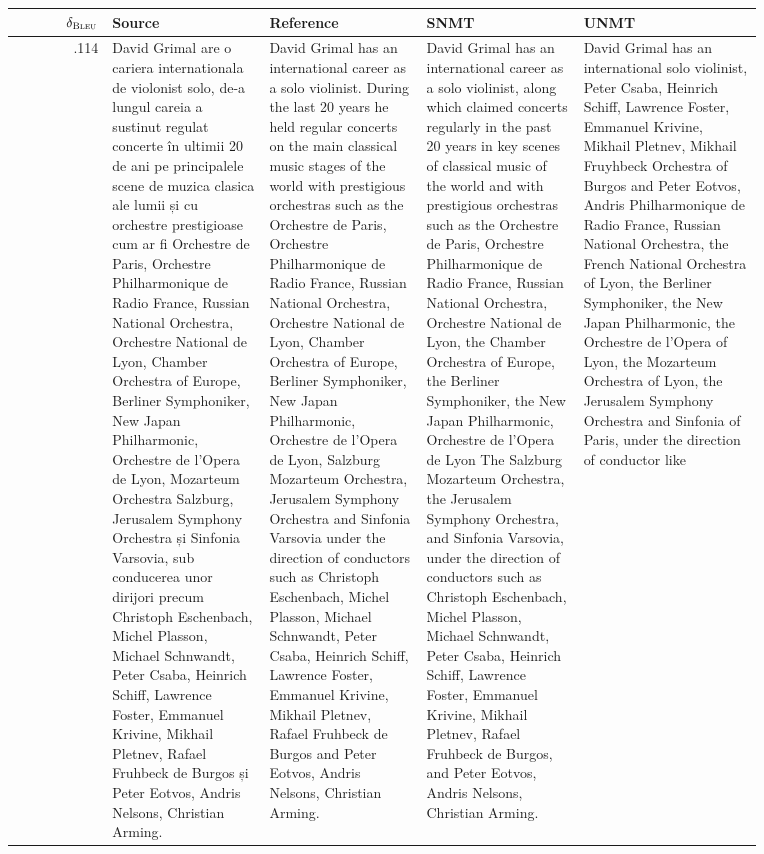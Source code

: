 \begin{table}[ht]
\centering
\fontsize{6.5}{6.5}
\selectfont
\begin{tabular}{r @{\hspace{1mm}} p{0.21\linewidth}p{0.21\linewidth}p{0.21\linewidth}p{0.24\linewidth}}
 $\delta_{{\textsc{Bleu}}}$& Source & Reference & SNMT & UNMT \\\hline\hline
.114 & David Grimal are o cariera internationala de violonist solo, de-a lungul careia a sustinut regulat concerte în ultimii 20 de ani pe principalele scene de muzica clasica ale lumii și cu orchestre prestigioase cum ar fi Orchestre de Paris, Orchestre Philharmonique de Radio France, Russian National Orchestra, Orchestre National de Lyon, Chamber Orchestra of Europe, Berliner Symphoniker, New Japan Philharmonic, Orchestre de l'Opera de Lyon, Mozarteum Orchestra Salzburg, Jerusalem Symphony Orchestra și Sinfonia Varsovia, sub conducerea unor dirijori precum Christoph Eschenbach, Michel Plasson, Michael Schnwandt, Peter Csaba, Heinrich Schiff, Lawrence Foster, Emmanuel Krivine, Mikhail Pletnev, Rafael Fruhbeck de Burgos și Peter Eotvos, Andris Nelsons, Christian Arming. & David Grimal has an international career as a solo violinist. During the last 20 years he held regular concerts on the main classical music stages of the world with prestigious orchestras such as the Orchestre de Paris, Orchestre Philharmonique de Radio France, Russian National Orchestra, Orchestre National de Lyon, Chamber Orchestra of Europe, Berliner Symphoniker, New Japan Philharmonic, Orchestre de l'Opera de Lyon, Salzburg Mozarteum Orchestra, Jerusalem Symphony Orchestra and Sinfonia Varsovia under the direction of conductors such as Christoph Eschenbach, Michel Plasson, Michael Schnwandt, Peter Csaba, Heinrich Schiff, Lawrence Foster, Emmanuel Krivine, Mikhail Pletnev, Rafael Fruhbeck de Burgos and Peter Eotvos, Andris Nelsons, Christian Arming. & David Grimal has an international career as a solo violinist, along which claimed concerts regularly in the past 20 years in key scenes of classical music of the world and with prestigious orchestras such as the Orchestre de Paris, Orchestre Philharmonique de Radio France, Russian National Orchestra, Orchestre National de Lyon, the Chamber Orchestra of Europe, the Berliner Symphoniker, the New Japan Philharmonic, Orchestre de l'Opera de Lyon The Salzburg Mozarteum Orchestra, the Jerusalem Symphony Orchestra, and Sinfonia Varsovia, under the direction of conductors such as Christoph Eschenbach, Michel Plasson, Michael Schnwandt, Peter Csaba, Heinrich Schiff, Lawrence Foster, Emmanuel Krivine, Mikhail Pletnev, Rafael Fruhbeck de Burgos, and Peter Eotvos, Andris Nelsons, Christian Arming. & David Grimal has an international solo violinist, Peter Csaba, Heinrich Schiff, Lawrence Foster, Emmanuel Krivine, Mikhail Pletnev, Mikhail Fruyhbeck Orchestra of Burgos and Peter Eotvos, Andris Philharmonique de Radio France, Russian National Orchestra, the French National Orchestra of Lyon, the Berliner Symphoniker, the New Japan Philharmonic, the Orchestre de l'Opera of Lyon, the Mozarteum Orchestra of Lyon, the Jerusalem Symphony Orchestra and Sinfonia of Paris, under the direction of conductor like 
\end{tabular}
\end{table}
